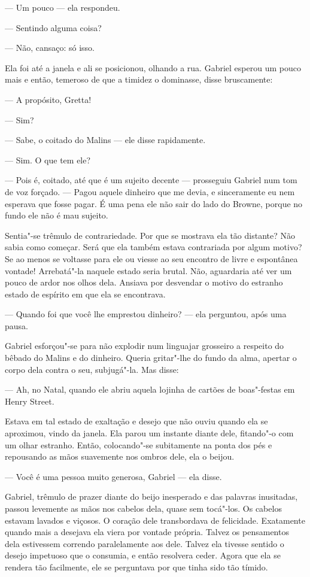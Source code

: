 --- Um pouco --- ela respondeu.

--- Sentindo alguma coisa?

--- Não, cansaço: só isso.

Ela foi até a janela e ali se posicionou, olhando a rua.  Gabriel esperou um
pouco mais e então, temeroso de que a timidez o dominasse, disse bruscamente:

--- A propósito, Gretta!

--- Sim?

--- Sabe, o coitado do Malins --- ele disse rapidamente.

--- Sim. O que tem ele?

--- Pois é, coitado, até que é um sujeito decente --- prosseguiu Gabriel num
tom de voz forçado.  --- Pagou aquele dinheiro que me devia, e sinceramente eu
nem esperava que fosse pagar.  É uma pena ele não sair do lado do Browne,
porque no fundo ele não é mau sujeito.

Sentia"-se trêmulo de contrariedade.  Por que se mostrava ela tão distante?  Não
sabia como começar.  Será que ela também estava contrariada por algum motivo?
Se ao menos se voltasse para ele ou viesse ao seu encontro de livre e
espontânea vontade!  Arrebatá"-la naquele estado seria brutal.  Não, aguardaria
até ver um pouco de ardor nos olhos dela.  Ansiava por desvendar o motivo do
estranho estado de espírito em que ela se encontrava.

--- Quando foi que você lhe emprestou dinheiro? --- ela perguntou, após uma
pausa.

Gabriel esforçou"-se para não explodir num linguajar grosseiro a respeito do
bêbado do Malins e do dinheiro.  Queria gritar"-lhe do fundo da alma, apertar o
corpo dela contra o seu, subjugá"-la.  Mas disse:

--- Ah, no Natal, quando ele abriu aquela lojinha de cartões de boas"-festas em
Henry Street.

Estava em tal estado de exaltação e desejo que não ouviu quando ela se
aproximou, vindo da janela.  Ela parou um instante diante dele, fitando"-o com
um olhar estranho.  Então, colocando"-se subitamente na ponta dos pés e
repousando as mãos suavemente nos ombros dele, ela o beijou.

--- Você é uma pessoa muito generosa, Gabriel --- ela disse.

Gabriel, trêmulo de prazer diante do beijo inesperado e das palavras
inusitadas, passou levemente as mãos nos cabelos dela, quase sem tocá"-los.  Os
cabelos estavam lavados e viçosos.  O coração dele transbordava de felicidade.
Exatamente quando mais a desejava ela viera por vontade própria.  Talvez os
pensamentos dela estivessem correndo paralelamente aos dele.  Talvez ela
tivesse sentido o desejo impetuoso que o consumia, e então resolvera ceder.
Agora que ela se rendera tão facilmente, ele se perguntava por que tinha sido
tão tímido.

